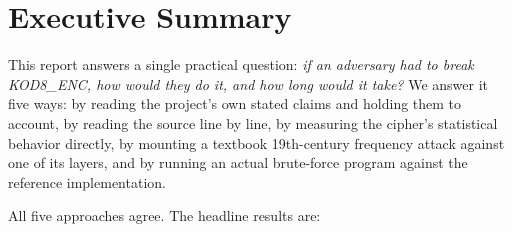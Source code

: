 \documentclass[11pt]{article}
\begin{document}
\begin{abstract}
persists the selected CipherList identifier as a cleartext header,
eliminating any classification uncertainty an attacker would otherwise
face. A conservative, no-shortcuts known-plaintext brute-force attack
over the full nominal keyspace recovers the key for the plain-text
CipherList in under 2.4 hours on a single CPU core using an unoptimized
reference Python implementation. Despite these findings, we note that
the project's own license text already scopes KOD8\_ENC for
``educational and obfuscation purposes'' --- precisely the classification
this report independently arrives at --- and a full claims traceability
matrix (Table~\ref{tab:traceability}) is provided so that each
individual marketing claim can be checked against its corresponding
evidence. We conclude that KOD8 is correctly classified as a composite
classical (product) cipher and a functional obfuscation layer, not as a
cryptographically secure primitive, and we outline concrete
remediations.
\end{abstract}

\tableofcontents
\newpage

\section{Executive Summary}

This report answers a single practical question: \emph{if an adversary
had to break KOD8\_ENC, how would they do it, and how long would it
take?} We answer it five ways: by reading the project's own stated
claims and holding them to account, by reading the source line by
line, by measuring the cipher's statistical behavior directly, by
mounting a textbook 19th-century frequency attack against one of its
layers, and by running an actual brute-force program against the
reference implementation.

All five approaches agree. The headline results are:
\end{document}
